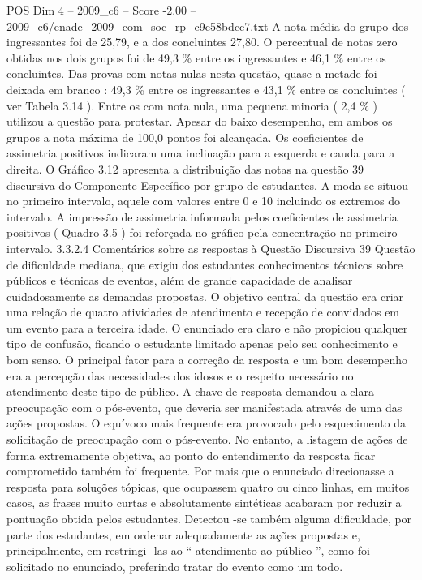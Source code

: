 \begin{textsample}{POS Dim 4 – 2009\_c6 – Score -2.00 – 2009\_c6/enade\_2009\_com\_soc\_rp\_c9c58bdcc7.txt}
A nota média do grupo dos ingressantes foi de 25,79, e a dos concluintes 27,80.
O percentual de notas zero obtidas nos dois grupos foi de 49,3 \% entre os ingressantes e 46,1 \% entre os concluintes.
Das provas com notas nulas nesta questão, quase a metade foi deixada em branco : 49,3 \% entre os ingressantes e 43,1 \% entre os concluintes ( ver Tabela 3.14 ).
Entre os com nota nula, uma pequena minoria ( 2,4 \% ) utilizou a questão para protestar.
Apesar do baixo desempenho, em ambos os grupos a nota máxima de 100,0 pontos foi alcançada.
Os coeficientes de assimetria positivos indicaram uma inclinação para a esquerda e cauda para a direita.
O Gráfico 3.12 apresenta a distribuição das notas na questão 39 discursiva do Componente Específico por grupo de estudantes.
A moda se situou no primeiro intervalo, aquele com valores entre 0 e 10 incluindo os extremos do intervalo.
A impressão de assimetria informada pelos coeficientes de assimetria positivos ( Quadro 3.5 ) foi reforçada no gráfico pela concentração no primeiro intervalo. 3.3.2.4 Comentários sobre as respostas à Questão Discursiva 39 Questão de dificuldade mediana, que exigiu dos estudantes conhecimentos técnicos sobre públicos e técnicas de eventos, além de grande capacidade de analisar cuidadosamente as demandas propostas.
O objetivo central da questão era criar uma relação de quatro atividades de atendimento e recepção de convidados em um evento para a terceira idade.
O enunciado era claro e não propiciou qualquer tipo de confusão, ficando o estudante limitado apenas pelo seu conhecimento e bom senso.
O principal fator para a correção da resposta e um bom desempenho era a percepção das necessidades dos idosos e o respeito necessário no atendimento deste tipo de público.
A chave de resposta demandou a clara preocupação com o pós-evento, que deveria ser manifestada através de uma das ações propostas.
O equívoco mais frequente era provocado pelo esquecimento da solicitação de preocupação com o pós-evento.
No entanto, a listagem de ações de forma extremamente objetiva, ao ponto do entendimento da resposta ficar comprometido também foi frequente.
Por mais que o enunciado direcionasse a resposta para soluções tópicas, que ocupassem quatro ou cinco linhas, em muitos casos, as frases muito curtas e absolutamente sintéticas acabaram por reduzir a pontuação obtida pelos estudantes.
Detectou -se também alguma dificuldade, por parte dos estudantes, em ordenar adequadamente as ações propostas e, principalmente, em restringi -las ao “ atendimento ao público ”, como foi solicitado no enunciado, preferindo tratar do evento como um todo.

\end{textsample}
